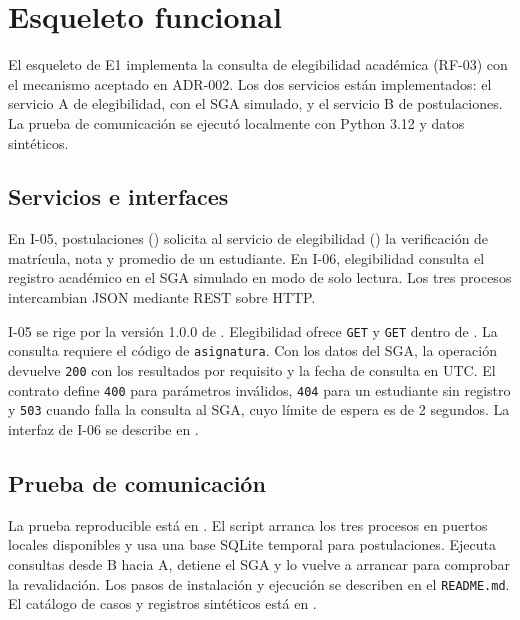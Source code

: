 \section{Esqueleto funcional}
\label{sec:esqueleto-funcional}

El esqueleto de E1 implementa la consulta de elegibilidad académica
(RF-03) con el mecanismo aceptado en ADR-002. Los dos servicios están
implementados: el servicio A de elegibilidad, con el SGA simulado, y el
servicio B de postulaciones. La prueba de comunicación
se ejecutó localmente con Python 3.12 y datos sintéticos.

\subsection{Servicios e interfaces}

En I-05, postulaciones () solicita
al servicio de elegibilidad () la
verificación de matrícula, nota y promedio de un estudiante. En I-06,
elegibilidad consulta el registro académico en el SGA simulado en modo
de solo lectura. Los tres procesos intercambian JSON mediante REST
sobre HTTP.

I-05 se rige por la versión 1.0.0 de
. Elegibilidad ofrece
\texttt{GET}  y \texttt{GET}
 dentro de
. La consulta requiere el código de \texttt{asignatura}.
Con los datos del SGA, la operación devuelve \texttt{200} con los
resultados por requisito y la fecha de consulta en UTC. El contrato
define \texttt{400} para parámetros inválidos, \texttt{404} para un
estudiante sin registro y \texttt{503} cuando falla la consulta al
SGA, cuyo límite de espera es de 2 segundos. La interfaz de I-06 se
describe en .

\subsection{Prueba de comunicación}

La prueba reproducible está en .
El script arranca los tres procesos en puertos locales disponibles y
usa una base SQLite temporal para postulaciones. Ejecuta consultas
desde B hacia A, detiene el SGA y lo vuelve a arrancar para comprobar
la revalidación. Los pasos de instalación y ejecución se describen en
el \texttt{README.md}. El catálogo de casos y registros sintéticos
está en .

